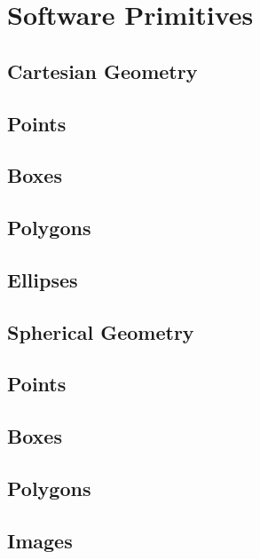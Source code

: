 \section{Software Primitives}
\label{sec:software-primitives}

\subsection{Cartesian Geometry}
\label{sec:spCartesianGeometry}

\subsection{Points}
\label{sec:spCartesianPoints}

\subsection{Boxes}
\label{sec:spCartesianBoxes}

\subsection{Polygons}
\label{sec:spCartesianPolygons}

\subsection{Ellipses}
\label{sec:spCartesianEllipses}

\subsection{Spherical Geometry}
\label{sec:spSphericalGeometry}

\subsection{Points}
\label{sec:spSphericalPoints}

\subsection{Boxes}
\label{sec:spSphericalBoxes}

\subsection{Polygons}
\label{sec:spSphericalPolygons}

\subsection{Images}
\label{sec:spImages}

